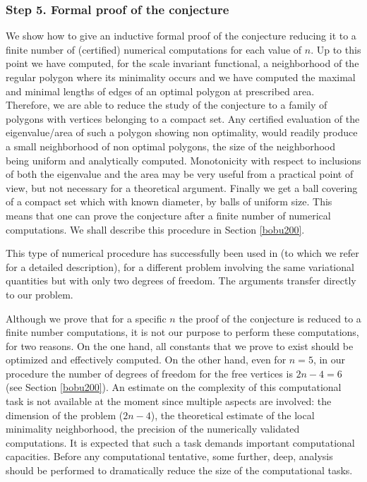 \documentclass[JEP,XML,SOM,Unicode,ThmDefs,NoFloatCountersInSection,published]{cedram}
\theoremstyle{plain}
\theoremstyle{definition}
\begin{document}
\subsubsection*{Step 5. Formal proof of the conjecture}
We show how to give an inductive formal proof of the conjecture reducing it to a finite number of (certified) numerical computations for each value of $n$. Up to this point we have computed, for the scale invariant functional, a neighborhood of the regular polygon where its minimality occurs and we have computed the maximal and minimal lengths of edges of an optimal polygon at prescribed area. Therefore, we are able to reduce the study of the conjecture to a family of polygons
with vertices belonging to a compact set. Any certified evaluation of the eigenvalue/area of such a polygon showing non optimality, would readily produce a small neighborhood of non optimal polygons, the size of the neighborhood being uniform and analytically computed. Monotonicity with respect to inclusions of both the eigenvalue and the area may be very useful from a practical point of view, but not necessary for a theoretical argument. Finally we get a ball covering of a compact set which with known diameter, by balls of uniform size. This means that one can prove the conjecture after a finite number of numerical computations. We shall describe this procedure in Section \ref{bobu200}.

This type of numerical procedure has successfully been used in \cite{BF16} (to which we refer for a detailed description), for a different problem involving the same variational quantities but with only two degrees of freedom. The arguments transfer directly to our problem.

Although we prove that for a specific $n$ the proof of the conjecture is reduced to a finite number computations, it is not our purpose to perform these computations, for two reasons. On the one hand, all constants that we prove to exist should be optimized and effectively computed. On the other hand, even for $n=5$, in our procedure the number of degrees of freedom for the free vertices is $2n-4=6$ (see Section \ref{bobu200}). An estimate on the complexity of this computational task is not available at the moment since multiple aspects are involved: the dimension of the problem ($2n-4$), the theoretical estimate of the local minimality neighborhood, the precision of the numerically validated computations. It is expected that such a task demands important computational capacities. Before any computational tentative, some further, deep, analysis should be performed to dramatically reduce the size of the computational tasks.
\end{document}
